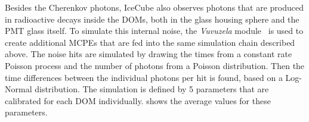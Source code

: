 Besides the Cherenkov photons, IceCube also observes photons that are produced in radioactive decays inside the DOMs, both in the glass housing sphere and the PMT glass itself. To simulate this internal noise, the \emph{Vuvuzela} module~ is used to create additional MCPEs that are fed into the same simulation chain described above. The noise hits are simulated by drawing the times from a constant rate Poisson process and the number of photons from a Poisson distribution. Then the time differences between the individual photons per hit is found, based on a Log-Normal distribution. The simulation is defined by 5 parameters that are calibrated for each DOM individually.  shows the average values for these parameters.
